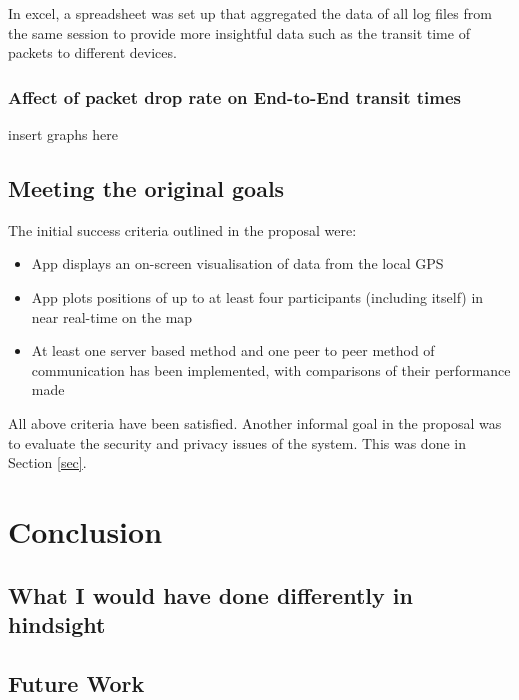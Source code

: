 In excel, a spreadsheet was set up that aggregated the data of all log files from the same session to provide more insightful data such as the transit time of packets to different devices.

\subsection{Affect of packet drop rate on End-to-End transit times}

insert graphs here

\section{Meeting the original goals}
The initial success criteria outlined in the proposal were:
\begin{itemize}
\item{App displays an on-screen visualisation of data from the local GPS}
\item{App plots positions of up to at least four participants (including itself) in
near real-time on the map}
\item{At least one server based method and one peer to peer method of communication has been implemented, with comparisons of their performance made}
\end{itemize}

All above criteria have been satisfied. Another informal goal in the proposal was to evaluate the security and privacy issues of the system. This was done in Section \ref{sec}.



\cleardoublepage
\chapter{Conclusion}

\section{What I would have done differently in hindsight}
\section{Future Work}

\cleardoublepage



